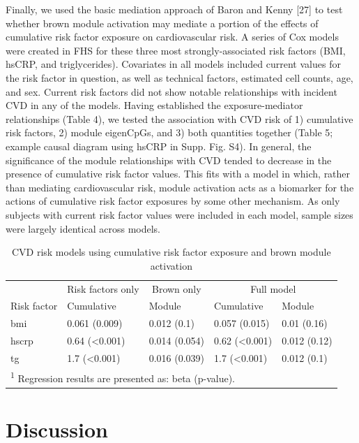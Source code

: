 \documentclass[]{article}
\theoremstyle{definition}
\theoremstyle{definition}
\theoremstyle{definition}
\theoremstyle{remark}
\begin{document}
Finally, we used the basic mediation approach of Baron and Kenny
{[}27{]} to test whether brown module activation may mediate a portion
of the effects of cumulative risk factor exposure on cardiovascular
risk. A series of Cox models were created in FHS for these three most
strongly-associated risk factors (BMI, hsCRP, and triglycerides).
Covariates in all models included current values for the risk factor in
question, as well as technical factors, estimated cell counts, age, and
sex. Current risk factors did not show notable relationships with
incident CVD in any of the models. Having established the
exposure-mediator relationships (Table 4), we tested the association
with CVD risk of 1) cumulative risk factors, 2) module eigenCpGs, and 3)
both quantities together (Table 5; example causal diagram using hsCRP in
Supp. Fig. S4). In general, the significance of the module relationships
with CVD tended to decrease in the presence of cumulative risk factor
values. This fits with a model in which, rather than mediating
cardiovascular risk, module activation acts as a biomarker for the
actions of cumulative risk factor exposures by some other mechanism. As
only subjects with current risk factor values were included in each
model, sample sizes were largely identical across models.

\begin{table}[H]
\caption{\label{tab:module-mediation}CVD risk models using cumulative risk factor exposure and brown module activation}
\centering
\begin{tabular}[t]{lllll}
\toprule
\multicolumn{1}{c}{} & \multicolumn{1}{c}{Risk factors only} & \multicolumn{1}{c}{Brown only} & \multicolumn{2}{c}{Full model} \\
\cmidrule(l{2pt}r{2pt}){2-2} \cmidrule(l{2pt}r{2pt}){3-3} \cmidrule(l{2pt}r{2pt}){4-5}
Risk factor & Cumulative & Module & Cumulative & Module\\
\midrule
bmi & 0.061 (0.009) & 0.012 (0.1) & 0.057 (0.015) & 0.01 (0.16)\\
hscrp & 0.64 (<0.001) & 0.014 (0.054) & 0.62 (<0.001) & 0.012 (0.12)\\
tg & 1.7 (<0.001) & 0.016 (0.039) & 1.7 (<0.001) & 0.012 (0.1)\\
\bottomrule
\multicolumn{5}{l}{\textsuperscript{1} Regression results are presented as: beta (p-value).}\\
\end{tabular}
\end{table}

\section{Discussion}\label{discussion}
\end{document}
